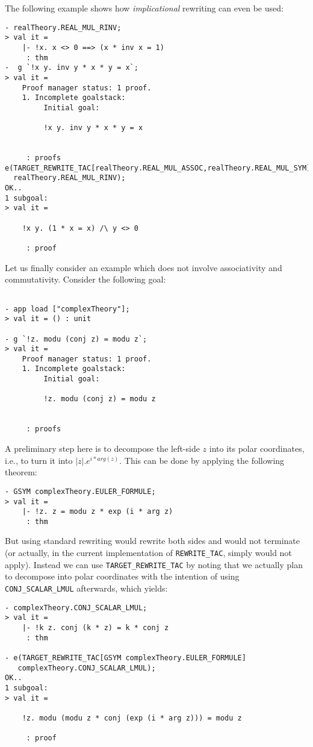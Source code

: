\documentclass{llncs}
\newcommand*\REWRITETAC{\texttt{REWRITE\_TAC}\xspace}
\newcommand*\TARGETTAC{\texttt{TARGET\_REWRITE\_TAC}\xspace}
\begin{document}
    \begin{example}
    The following example shows how \emph{implicational} rewriting can even be used:
    \begin{verbatim}
- realTheory.REAL_MUL_RINV;
> val it =
    |- !x. x <> 0 ==> (x * inv x = 1)
     : thm
-  g `!x y. inv y * x * y = x`;
> val it =
    Proof manager status: 1 proof.
    1. Incomplete goalstack:
         Initial goal:
    
         !x y. inv y * x * y = x
    
    
     : proofs
e(TARGET_REWRITE_TAC[realTheory.REAL_MUL_ASSOC,realTheory.REAL_MUL_SYM] 
  realTheory.REAL_MUL_RINV);
OK..
1 subgoal:
> val it =
    
    !x y. (1 * x = x) /\ y <> 0
    
     : proof \end{verbatim}    
    \end{example}

    \begin{example}
    Let us finally consider an example which does not involve associativity and commutativity.
    Consider the following goal:
    \begin{verbatim}

- app load ["complexTheory"];
> val it = () : unit
    
- g `!z. modu (conj z) = modu z`;
> val it =
    Proof manager status: 1 proof.
    1. Incomplete goalstack:
         Initial goal:
    
         !z. modu (conj z) = modu z
    
    
     : proofs \end{verbatim}
    A preliminary step here is to decompose the left-side $z$ into its polar coordinates, 
    i.e., to turn it into $|z|.e^{i*arg(z)}$.
    This can be done by applying the following theorem:
    \begin{verbatim}
- GSYM complexTheory.EULER_FORMULE;
> val it =
    |- !z. z = modu z * exp (i * arg z)
     : thm\end{verbatim}
    But using standard rewriting would rewrite both sides and would not terminate
    (or actually, in the current implementation of \REWRITETAC, simply would not apply).
    Instead we can use \TARGETTAC by noting that we actually plan to decompose into polar coordinates 
    with the intention of using \texttt{CONJ\_SCALAR\_LMUL} afterwards, which yields:
    \begin{verbatim}
- complexTheory.CONJ_SCALAR_LMUL;
> val it =
    |- !k z. conj (k * z) = k * conj z
     : thm

- e(TARGET_REWRITE_TAC[GSYM complexTheory.EULER_FORMULE]
   complexTheory.CONJ_SCALAR_LMUL);
OK..
1 subgoal:
> val it =
    
    !z. modu (modu z * conj (exp (i * arg z))) = modu z
    
     : proof \end{verbatim}
    \end{example}
\end{document}
